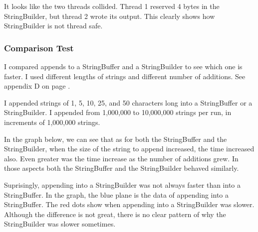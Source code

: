 It looks like the two threads collided. Thread 1 reserved 4 bytes in the StringBuilder, but thread 2 wrote its output. This clearly shows how StringBuilder is not thread safe.

\subsubsection{Comparison Test}
I compared appends to a StringBuffer and a StringBuilder to see which one is faster. I used different lengths of strings and different number of additions. See appendix D on page \pageref{App:AppendixD}.

I appended strings of 1, 5, 10, 25, and 50 characters long into a StringBuffer or a StringBuilder. I appended from 1,000,000 to 10,000,000 strings per run, in increments of 1,000,000 strings.

In the graph below, we can see that as for both the StringBuffer and the StringBuilder, when the size of the string to append increased, the time increased also. Even greater was the time increase as the number of additions grew. In those aspects both the StringBuffer and the StringBuilder behaved similarly.

Suprisingly, appending into a StringBuilder was not always faster than into a StringBuffer. In the graph, the blue plane is the data of appending into a StringBuffer. The red dots show when appending into a StringBuilder was slower. Although the difference is not great, there is no clear pattern of why the StringBuilder was slower sometimes.

\begin{figure}[H]\centering
\begin{framed}
\end{framed}
\label{fig:stringbuildervsStringBuffer}
\end{figure}
